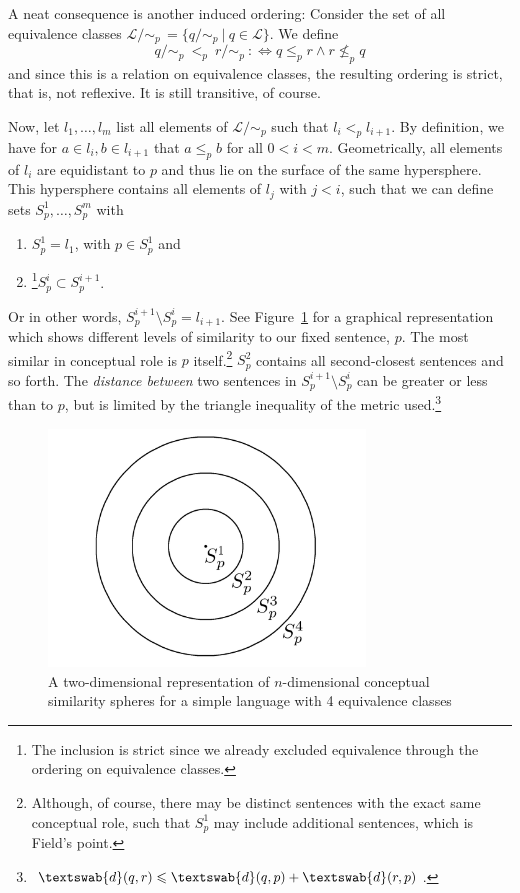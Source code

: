 \documentclass[11pt, a4paper]{scrartcl}
\renewcommand{\i}[1]{\emph{#1}}
\renewcommand{\L}{\mathcal{L}}
\newcommand{\m}[1]{\textswab{#1}}
\newcommand{\given}[1][]{\:#1\vert\:}
\begin{document}
A neat consequence is another induced ordering: Consider the set of all equivalence classes $\L/\!\sim_p\,=\{ q/\!\sim_p \given q\in \L \}$. We define   
\[
    q/\!\sim_p~<_p~r/\!\sim_p~:\Leftrightarrow q \leqslant_p r \land r \not\leqslant_p q
\]
and since this is a relation on equivalence classes, the resulting ordering is strict, that is, not reflexive. It is still transitive, of course.

Now, let $l_1, \ldots, l_m$ list all elements of $\L/\!\sim_p$ such that $l_i <_p l_{i+1}$. By definition, we have for $a \in l_i, b \in l_{i+1}$ that $a \leqslant_p b$ for all $0 < i < m$. Geometrically, all elements of $l_i$ are equidistant to $p$ and thus lie on the surface of the same hypersphere. This hypersphere contains all elements of $l_j$ with $j < i$, such that we can define sets $S^1_p, \ldots, S^m_p$ with 
\begin{enumerate}[label = (\roman*)]
    \item $S^1_p = l_1$, with $p \in S^1_p$ and 
    \item\footnote{The inclusion is strict since we already excluded equivalence through the ordering on equivalence classes.}$S^i_p \subset S^{i+1}_p$. 
\end{enumerate}
Or in other words, $S^{i+1}_p \setminus S^{i}_p = l_{i+1}$. See Figure~\ref{fig:spheres} for a graphical representation which shows different levels of similarity to our fixed sentence, $p$. The most similar in conceptual role is $p$ itself.\footnote{Although, of course, there may be distinct sentences with the exact same conceptual role,  such that $S^1_p$ may include additional sentences, which is Field's point.} $S^2_p$ contains all second-closest sentences and so forth. The \i{distance between} two sentences in $S^{i+1}_p\setminus S^{i}_p$ can be greater or less than to $p$, but is limited by the triangle inequality of the metric used.\footnote{$\m{d}(q,r) \leqslant \m{d}(q,p) + \m{d}(r,p)$.} 

\begin{figure}
	\centering
    \includegraphics[width=0.75\textwidth]{Similarityspheres.png}
    \caption{A two-dimensional representation of $n$-dimensional conceptual similarity spheres for a simple language with 4 equivalence classes\label{fig:spheres}}
\end{figure}
\end{document}
